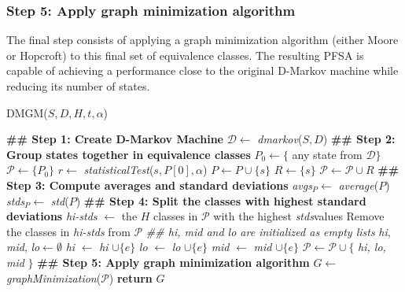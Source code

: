 {\subsubsection{Step 5: Apply graph minimization algorithm}

The final step consists of applying a graph minimization algorithm (either Moore or Hopcroft) to this final set of equivalence classes. The resulting PFSA is capable of achieving a performance close to the original D-Markov machine while reducing its number of states. 

  \begin{algorithm}[H]
  \caption{DMGM($S, D, H, t, \alpha$)\label{alg:dmgm}}
    \begin{algorithmic}[1]
      	\State \textbf{\#\# Step 1: Create D-Markov Machine}
      	\State $\mathcal{D} \gets$ \textit{dmarkov}($S,D$)
      	\State \textbf{\#\# Step 2: Group states together in equivalence classes}  
      	\State $P_0 \gets \{$ any state from $\mathcal{D}\}$    	
      	\State $\mathcal{P} \gets \{P_0\}$
      			\State $r \gets$ \textit{statisticalTest}($s, P[0], \alpha$)
      				\State $P \gets P \cup \{s\}$
      			\Else
      				\State $R \gets \{s\}$
      				\State $\mathcal{P} \gets \mathcal{P}\cup R$
      			\EndIf
      		\EndFor
      	\EndFor
      	\State \textbf{\#\# Step 3: Compute averages and standard deviations}
      		\State \textit{avgs}$_P \gets$ \textit{average}($P$)
      		\State \textit{stds}$_P \gets$ \textit{std}($P$)
      	\EndFor      	
      	\State \textbf{\#\# Step 4: Split the classes with highest standard deviations}
      	\State \textit{hi-stds} $\gets$ the $H$ classes in $\mathcal{P}$ with the highest \textit{stds}values
      	\State Remove the classes in \textit{hi-stds} from $\mathcal{P}$
      	    \State \textit{\#\# hi, mid and lo are initialized as empty lists}
      		\State \textit{hi}, \textit{mid}, \textit{lo}$ \gets \emptyset$
      				\State \textit{hi} $\gets$ \textit{hi} $\cup \{e\}$
      				\State \textit{lo} $\gets$ \textit{lo} $\cup \{e\}$
      			\Else      				
      				\State \textit{mid} $\gets$ \textit{mid} $\cup \{e\}$
      			\EndIf
      		\EndFor
      		\State $\mathcal{P} \gets \mathcal{P}\cup\{$ \textit{hi, lo, mid} $\}$
      	\EndFor
      	\State \textbf{\#\# Step 5: Apply graph minimization algorithm}
      	\State $G \gets$ \textit{graphMinimization}($\mathcal{P}$)
      	\State \textbf{return} $G$
      \EndProcedure
    \end{algorithmic}
  \end{algorithm}
  
}
